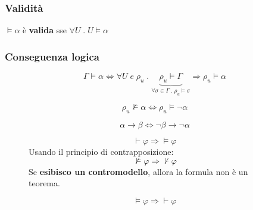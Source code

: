 \documentclass{article}
\theoremstyle{break}
\theoremstyle{break}
\theoremstyle{break}
\theoremstyle{break}
\begin{document}
\subsubsection{Validità}
\( \models \alpha \) è \textbf{valida} sse \( \forall U \; . \; U \models \alpha \) 

\subsubsection{Conseguenza logica}
\[
  \Gamma \models \alpha \Leftrightarrow \forall U \; e \; \rho_u \; . \; \underbrace{\rho_u \models \Gamma}_{\forall \sigma \in \Gamma \; . \; \rho_u \models \sigma} \Rightarrow \rho_u \models \alpha
\] 
    \begin{figure}[H]
      \begin{definition}
        \[
          \rho_u \not\models \alpha \Leftrightarrow \rho_u \models \neg \alpha
        \] 
      \end{definition}
    \end{figure}
\begin{figure}[H]
  \begin{figure}[H]
    \begin{definition}
      \[
        \alpha \to \beta \Leftrightarrow \neg \beta \to \neg \alpha
      \] 
    \end{definition}
  \end{figure}
  \begin{definition}[Soundness]
    \[
    \vdash \varphi  \Rightarrow \models \varphi 
    \] 
    Usando il principio di contrapposizione:
    \[
    \not\models \varphi  \Rightarrow \not\vdash \varphi 
    \] 
    Se \textbf{esibisco un contromodello}, allora la formula non è un teorema.
  \end{definition}
\end{figure}
\begin{figure}[H]
  \begin{definition}[Completeness]
    \[
    \models \varphi  \Rightarrow \vdash \varphi 
    \] 
  \end{definition}
\end{figure}
\end{document}
